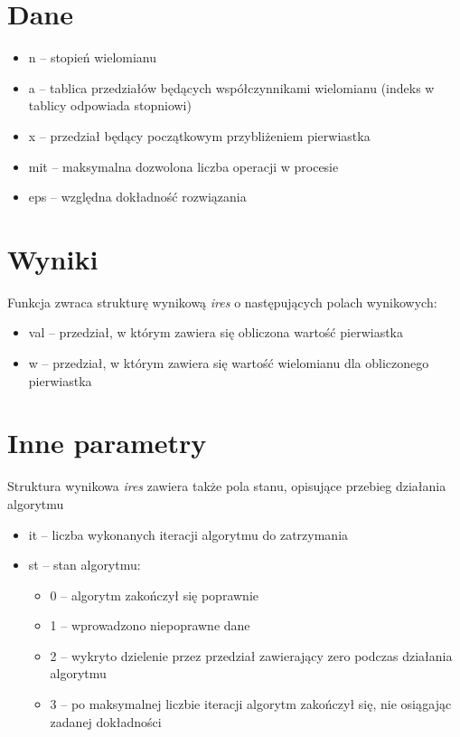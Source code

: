 \documentclass[a4paper]{article}
\begin{document}
\section{Dane}
\begin{itemize}
\item n -- stopień wielomianu
\item a -- tablica przedziałów będących współczynnikami wielomianu (indeks w tablicy odpowiada stopniowi)
\item x -- przedział będący początkowym przybliżeniem pierwiastka
\item mit -- maksymalna dozwolona liczba operacji w procesie
\item eps -- względna dokładność rozwiązania
\end{itemize}

\section{Wyniki}
Funkcja zwraca strukturę wynikową \emph{ires} o następujących polach wynikowych:
\begin{itemize}
\item val -- przedział, w którym zawiera się obliczona wartość pierwiastka
\item w -- przedział, w którym zawiera się wartość wielomianu dla obliczonego pierwiastka
\end{itemize}

\section{Inne parametry}
Struktura wynikowa \emph{ires} zawiera także pola stanu, opisujące przebieg działania algorytmu
\begin{itemize}
\item it -- liczba wykonanych iteracji algorytmu do zatrzymania
\item st -- stan algorytmu:
\begin{itemize}
\item 0 -- algorytm zakończył się poprawnie
\item 1 -- wprowadzono niepoprawne dane
\item 2 -- wykryto dzielenie przez przedział zawierający zero podczas działania algorytmu
\item 3 -- po maksymalnej liczbie iteracji algorytm zakończył się, nie osiągając zadanej dokładności
\end{itemize}
\end{itemize}
\end{document}

